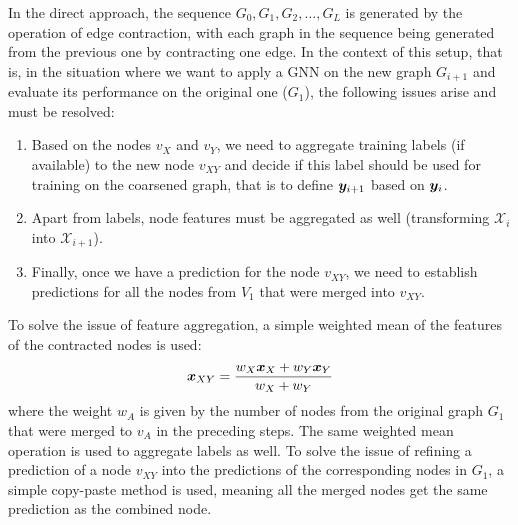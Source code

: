 In the direct approach, the sequence \( G_0, G_1, G_2, \dots, G_L \) is generated by the operation of edge contraction, with each graph in the sequence being generated from the previous one by contracting one edge. In the context of this setup, that is, in the situation where we want to apply a GNN on the new graph $G_{i+1}$ and evaluate its performance on the original one ($G_1$), the following issues arise and must be resolved:

\begin{enumerate}
	\item Based on the nodes $v_{X}$ and $v_{Y}$, we need to aggregate training labels (if available) to the new node $v_{XY}$ and decide if this label should be used for training on the coarsened graph, that is to define $\bm{y}_{i+1}$ based on $\bm{y}_i$.
	\item Apart from labels, node features must be aggregated as well (transforming $\mathcal{X}_i$ into $\mathcal{X}_{i+1}$).
	\item Finally, once we have a prediction for the node $v_{XY}$, we need to establish predictions for all the nodes from $V_1$ that were merged into $v_{XY}$.
\end{enumerate}

To solve the issue of feature aggregation, a simple weighted mean of the features of the contracted nodes is used:
\begin{equation}
	\bm{x}_{XY} = \frac{w_X \bm{x}_X+w_Y \bm{x}_Y}{w_X + w_Y}
\end{equation}
where the weight $w_A$ is given by the number of nodes from the original graph $G_1$ that were merged to $v_A$ in the preceding steps. The same weighted mean operation is used to aggregate labels as well. To solve the issue of refining a prediction of a node \( v_{XY} \) into the predictions of the corresponding nodes in \( G_1 \), a simple copy-paste method is used, meaning all the merged nodes get the same prediction as the combined node.

